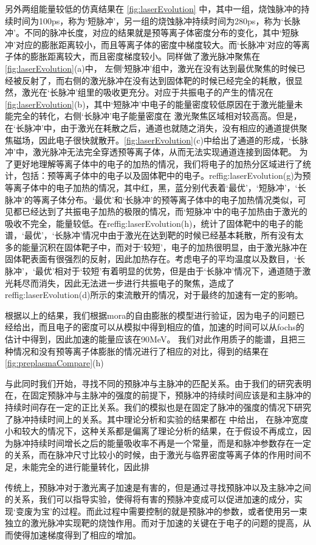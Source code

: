 另外两组能量较低的仿真结果在 \ref{fig:laserEvolution} 中，其中一组，烧蚀脉冲的持续时间为100ps，称为‘短脉冲’，另一组的烧蚀脉冲持续时间为280ps，称为‘长脉冲’。不同的脉冲长度，对应的结果就是预等离子体密度分布的变化，其中‘短脉冲’对应的膨胀距离较小，而且等离子体的密度中梯度较大。而‘长脉冲’对应的等离子体的膨胀距离较大，而且密度梯度较小。同样做了激光脉冲聚焦在\ref{fig:laserEvolution}(a)中， 左侧‘短脉冲’组中，激光在没有达到最优聚焦的时候已经被反射了，而右侧的激光脉冲在没有达到固体靶的时候已经完全的耗散，很显然，激光在‘长脉冲’组里的吸收更充分。对应于共振电子的产生的情况在\ref{fig:laserEvolution}(b)，其中‘短脉冲’中电子的能量密度较低原因在于激光能量未能完全的转化，右侧‘长脉冲’电子能量密度在 激光聚焦区域相对较高高。但是， 在‘长脉冲’中，由于激光在耗散之后，通道也就随之消失，没有相应的通道提供聚焦磁场，因此电子很快就散开。\ref{fig:laserEvolution}(c)中给出了通道的形成，‘长脉冲’中，激光脉冲无法完全穿透预等离子体，从而无法实现通道连接到固体靶。 为了更好地理解等离子体中的电子的加热的情况，我们将电子的加热分区域进行了统计，包括：预等离子体中的电子以及固体靶中的电子。ref{fig:laserEvolution}(g)为预等离子体中的电子加热的情况，其中红，黑，蓝分别代表着‘最优’，‘短脉冲’，‘长脉冲’的等离子体分布。‘最优’和‘长脉冲’的预等离子体中的电子加热情况类似，可见都已经达到了共振电子加热的极限的情况，而‘短脉冲’中的电子加热由于激光的吸收不完全，能量较低。在ref{fig:laserEvolution}(h)，统计了固体靶中的电子的能谱，‘最优’，‘长脉冲’情况中由于激光在达到靶的时候已经基本耗散，所有没有太多的能量沉积在固体靶子中，而对于‘较短’，电子的加热很明显，由于激光脉冲在固体靶表面有很强烈的反射，因此加热存在。考虑电子的平均温度以及数目，‘长脉冲’，‘最优’相对于‘较短’有着明显的优势，但是由于‘长脉冲’情况下，通道随于激光耗尽而消失，因此无法进一步进行共振电子的聚焦，造成了ref{fig:laserEvolution}(d)所示的束流散开的情况，对于最终的加速有一定的影响。



根据以上的结果，我们根据mora的自由膨胀的模型进行验证，因为电子的问题已经给出，而且电子的密度可以从模拟中得到相应的值，加速的时间可以从fochs的估计中得到，因此加速的能量应该在90MeV。 我们对此作用质子的能谱，且把三种情况和没有预等离子体膨胀的情况进行了相应的对比，得到的结果在\ref{fig:preplasmaCompare}(h)



与此同时我们开始，寻找不同的预脉冲与主脉冲的匹配关系。由于我们的研究表明在，在固定预脉冲与主脉冲的强度的前提下，预脉冲的持续时间应该是和主脉冲的持续时间存在一定的正比关系。我们的模拟也是在固定了脉冲的强度的情况下研究了脉冲持续时间上的关系。其中理论分析和实验的结果都在 中给出， 在脉冲宽度小和较大的情况下，这种关系都是偏离了理论分析的结果，在于假设不再成立，因为脉冲持续时间增长之后的能量吸收率不再是一个常量，而是和脉冲参数存在一定的关系，而在脉冲尺寸比较小的时候，由于激光与临界密度等离子体的作用时间不足，未能完全的进行能量转化，因此排




传统上，预脉冲对于激光离子加速是有害的，但是通过寻找预脉冲以及主脉冲之间的关系，我们可以指导实验，使得将有害的预脉冲变成可以促进加速的成分，实现‘变废为宝’的过程。而此过程中需要控制的就是预脉冲的参数，或者使用另一束独立的激光脉冲实现靶的烧蚀作用。而对于加速的关键在于电子的问题的提高，从而使得加速梯度得到了相应的增加。


